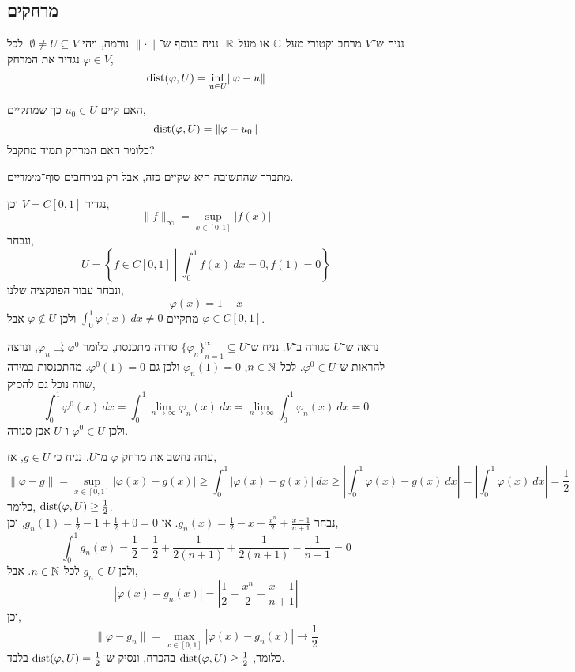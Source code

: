 \subsection{מרחקים}
\begin{definition}
	נניח ש־$V$ מרחב וקטורי מעל $\mathbb{C}$ או מעל $\mathbb{R}$.
	נניח בנוסף ש־$\lVert \cdot \rVert$ נורמה, ויהי $\emptyset \ne U \subseteq V$.
	לכל $\varphi \in V$ נגדיר את המרחק,
	\[
		\operatorname{dist}(\varphi, U)
		= \inf_{u \in U} \lVert \varphi - u \rVert
	\]
\end{definition}
\begin{exercise}
	האם קיים $u_0 \in U$ כך שמתקיים,
	\[
		\operatorname{dist}(\varphi, U)
		= \lVert \varphi - u_0 \rVert
	\]
	כלומר האם המרחק תמיד מתקבל?
\end{exercise}
מתברר שהתשובה היא שקיים כזה, אבל רק במרחבים סוף־מימדיים.
\begin{example}
	נגדיר $V = C[0, 1]$ וכן,
	\[
		\lVert f \rVert_\infty
		= \sup_{x \in [0, 1]} |f(x)|
	\]
	ונבחר,
	\[
		U = \left\{ f \in C[0, 1] \middle| \int_{0}^{1} f(x)\ dx = 0, f(1) = 0 \right\}
	\]
	ונבחר עבור הפונקציה שלנו,
	\[
		\varphi(x) = 1 - x
	\]
	מתקיים $\int_{0}^{1} \varphi(x)\ dx \ne 0$ ולכן $\varphi \notin U$ אבל $\varphi \in C[0, 1]$.

	נראה ש־$U$ סגורה ב־$V$.
	נניח ש־${\{ \varphi_n \}}_{n = 1}^\infty \subseteq U$ סדרה מתכנסת, כלומר $\varphi_n \rightrightarrows \varphi^0$, ונרצה להראות ש־$\varphi^0 \in U$.
	לכל $n \in \mathbb{N}$, $\varphi_n(1) = 0$ ולכן גם $\varphi^0(1) = 0$.
	מהתכנסות במידה שווה נוכל גם להסיק,
	\[
		\int_{0}^{1} \varphi^0(x)\ dx
		= \int_{0}^{1} \lim_{n \to \infty} \varphi_n(x)\ dx
		= \lim_{n \to \infty} \int_{0}^{1} \varphi_n(x)\ dx
		= 0
	\]
	ולכן $\varphi^0 \in U$ ו־$U$ אכן סגורה.

	עתה נחשב את מרחק $\varphi$ מ־$U$.
	נניח כי $g \in U$, אז,
	\[
		\lVert \varphi - g \rVert
		= \sup_{x \in [0, 1]} |\varphi(x) - g(x)|
		\ge \int_{0}^{1} |\varphi(x) - g(x)|\ dx
		\ge \left\lvert \int_{0}^{1} \varphi(x) - g(x)\ dx \right\rvert
		= \left\lvert \int_{0}^{1} \varphi(x)\ dx \right\rvert
		= \frac{1}{2}
	\]
	כלומר, $\operatorname{dist}(\varphi, U) \ge \frac{1}{2}$. \\
	נבחר $g_n(x) = \frac{1}{2} - x + \frac{x^n}{2} + \frac{x - 1}{n + 1}$.
	אז $g_n(1) = \frac{1}{2} - 1 + \frac{1}{2} + 0 = 0$, וכן,
	\[
		\int_{0}^{1} g_n(x)
		= \frac{1}{2} - \frac{1}{2} + \frac{1}{2(n + 1)} + \frac{1}{2(n + 1)} - \frac{1}{n + 1}
		= 0
	\]
	ולכן $g_n \in U$ לכל $n \in \mathbb{N}$.
	אבל,
	\[
		|\varphi(x) - g_n(x)|
		= \left\lvert \frac{1}{2} - \frac{x^n}{2} - \frac{x - 1}{n + 1} \right\rvert
	\]
	וכן,
	\[
		\lVert \varphi - g_n \rVert
		= \max_{x \in [0, 1]} |\varphi(x) - g_n(x)| \to \frac{1}{2}
	\]
	כלומר, $\operatorname{dist}(\varphi, U) \ge \frac{1}{2}$ בהכרח, ונסיק ש־$\operatorname{dist}(\varphi, U) = \frac{1}{2}$ בלבד.


\end{example}
